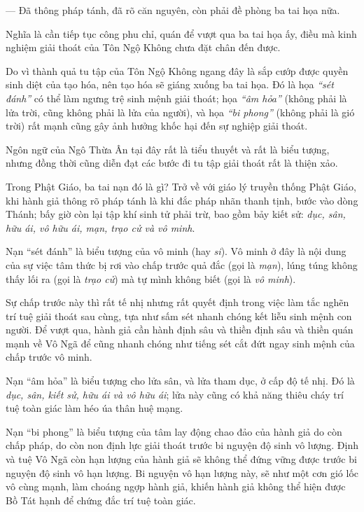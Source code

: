 --- Đã thông pháp tánh, đã rõ căn nguyên, còn phải đề phòng ba tai họa nữa.

Nghĩa là cần tiếp tục công phu chỉ, quán để vượt qua ba tai họa ấy, điều mà kinh nghiệm giải thoát của Tôn Ngộ Không chưa đặt chân đến được.

Do vì thành quả tu tập của Tôn Ngộ Không ngang đây là sắp cướp được quyền sinh diệt của tạo hóa, nên tạo hóa sẽ giáng xuống ba tai họa. Đó là họa \emph{``sét đánh''} có thể làm ngưng trệ sinh mệnh giải thoát; họa \emph{``âm hỏa''} (không phải là lửa trời, cũng không phải là lửa của người), và họa \emph{``bi phong''} (không phải là gió trời) rất mạnh cũng gây ảnh hưởng khốc hại đến sự nghiệp giải thoát.

Ngôn ngữ của Ngô Thừa Ân tại đây rất là tiểu thuyết và rất là biểu tượng, nhưng đồng thời cũng diễn đạt các bước đi tu tập giải thoát rất là thiện xảo.

Trong Phật Giáo, ba tai nạn đó là gì? Trở về với giáo lý truyền thống Phật Giáo, khi hành giả thông rõ pháp tánh là khi đắc pháp nhãn thanh tịnh, bước vào dòng Thánh; bấy giờ còn lại tập khí sinh tử phải trừ, bao gồm bảy kiết sử: \emph{dục, sân, hữu ái, vô hữu ái, mạn, trạo cử và vô minh}.

Nạn ``sét đánh'' là biểu tượng của vô minh (hay \emph{si}). Vô minh ở đây là nội dung của sự việc tâm thức bị rơi vào chấp trước quả đắc (gọi là \emph{mạn}), lúng túng không thấy lối ra (gọi là \emph{trạo cử}) mà tự mình không biết (gọi là \emph{vô minh}).

Sự chấp trước này thì rất tế nhị nhưng rất quyết định trong việc làm tắc nghẽn trí tuệ giải thoát sau cùng, tựa như sấm sét nhanh chóng kết liễu sinh mệnh con người. Để vượt qua, hành giả cần hành định sâu và thiền định sâu và thiền quán mạnh về Vô Ngã để cũng nhanh chóng như tiếng sét cắt đứt ngay sinh mệnh của chấp trước vô minh.

Nạn ``âm hỏa'' là biểu tượng cho lửa sân, và lửa tham dục, ở cấp độ tế nhị. Đó là \emph{dục, sân, kiết sử, hữu ái và vô hữu ái}; lửa này cũng có khả năng thiêu cháy trí tuệ toàn giác làm héo úa thân huệ mạng.

Nạn ``bi phong'' là biểu tượng của tâm lay động chao đảo của hành giả do còn chấp pháp, do còn non định lực giải thoát trước bi nguyện độ sinh vô lượng. Định và tuệ Vô Ngã còn hạn lượng của hành giả sẽ không thể đứng vững được trước bi nguyện độ sinh vô hạn lượng. Bi nguyện vô hạn lượng này, sẽ như một cơn gió lốc vô cùng mạnh, làm choáng ngợp hành giả, khiến hành giả không thể hiện được Bồ Tát hạnh để chứng đắc trí tuệ toàn giác.

